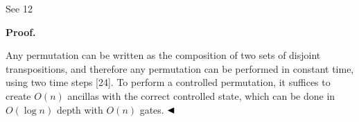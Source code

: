  
 
See 12\par
 
 
 
 
\par\medskip\noindent\textbf{Proof.}\par
 
 
Any permutation can be written as the composition of two sets of disjoint transpositions, and therefore any permutation can be performed in constant time, using two time steps [24]. To perform a controlled permutation, it suffices to create $O(n)$ ancillas with the correct controlled state, which can be done in $O(\log n)$ depth with $O(n)$ gates. $\hfill\blacktriangleleft$\par
 
 
 
